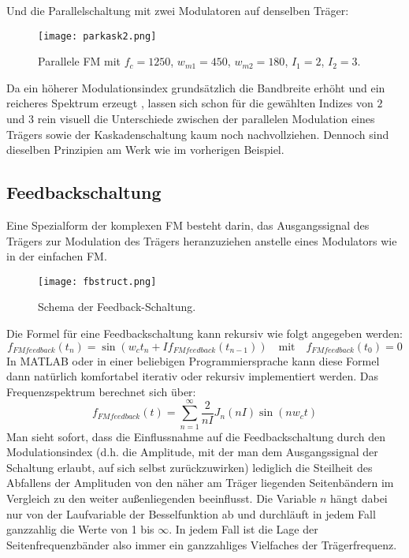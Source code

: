 \FloatBarrier
Und die Parallelschaltung mit zwei Modulatoren auf denselben Träger:
\FloatBarrier
\begin{figure} [ht]
\centering
  \texttt{[image: parkask2.png]}
\caption{Parallele FM mit $f_c = 1250$, $w_{m1} = 450$, $w_{m2} = 180$, $I_1 = 2$, $I_2 = 3$. }
\end{figure}
\FloatBarrier
Da ein höherer Modulationsindex grundsätzlich die Bandbreite erhöht und ein reicheres Spektrum erzeugt \cite{chowningPaper}, lassen sich schon für die gewählten Indizes von $2$ und $3$ rein visuell die Unterschiede zwischen der parallelen Modulation eines Trägers sowie der Kaskadenschaltung kaum noch nachvollziehen. Dennoch sind dieselben Prinzipien am Werk wie im vorherigen Beispiel.

\subsection{Feedbackschaltung}

Eine Spezialform der komplexen FM besteht darin, das Ausgangssignal des Trägers zur Modulation des Trägers heranzuziehen anstelle eines Modulators wie in der einfachen FM. 
\FloatBarrier
\begin{figure} [ht]
\centering
  \texttt{[image: fbstruct.png]}
\caption{Schema der Feedback-Schaltung. }
\end{figure}
\FloatBarrier
Die Formel für eine Feedbackschaltung kann rekursiv wie folgt angegeben werden:
\begin{equation}
f_{FMfeedback}(t_{n}) = \sin(w_{c}t_{n} + If_{FMfeedback}(t_{n-1})) \quad \text{mit} \quad f_{FMfeedback}(t_{0}) = 0
\end{equation}
In MATLAB oder in einer beliebigen Programmiersprache kann diese Formel dann natürlich komfortabel iterativ oder rekursiv implementiert werden.
Das Frequenzspektrum berechnet sich \cite{schottiWeb} über:
\begin{equation}
f_{FMfeedback}(t) = \sum_{n=1}^{\infty}\frac{2}{nI}J_n(nI)\sin(nw_{c}t)
\end{equation}
Man sieht sofort, dass die Einflussnahme auf die Feedbackschaltung durch den Modulationsindex (d.h. die Amplitude, mit der man dem Ausgangssignal der Schaltung erlaubt, auf sich selbst zurückzuwirken) lediglich die Steilheit des Abfallens der Amplituden von den näher am Träger liegenden Seitenbändern im Vergleich zu den weiter außenliegenden beeinflusst. Die Variable $n$ hängt dabei nur von der Laufvariable der Besselfunktion ab und durchläuft in jedem Fall ganzzahlig die Werte von 1 bis $\infty$. In jedem Fall ist die Lage der Seitenfrequenzbänder also immer ein ganzzahliges Vielfaches der Trägerfrequenz. 

